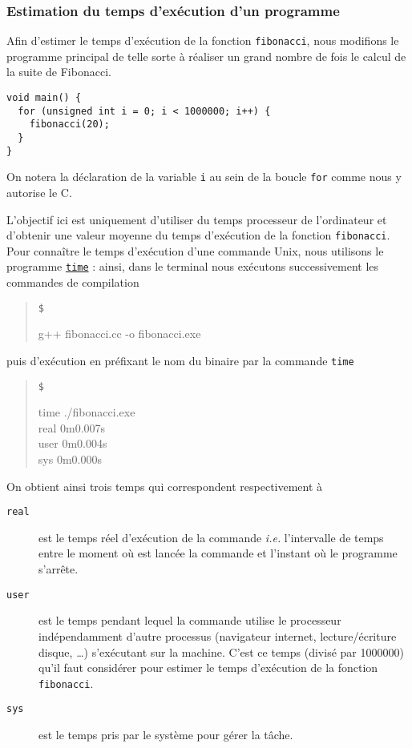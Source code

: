 \documentclass{book}
\newenvironment{prompt}{\begin{quote}\color{blue!75}\tt\$\,
}{\end{quote}}
\newcommand{\cpp}{\mbox{C\vspace{.5em}\protect\raisebox{.2ex}{\footnotesize++~}}}
\begin{document}
\begin{correction}
\subsubsection{Estimation du temps d'exécution d'un programme}

Afin d'estimer le temps d'exécution de la fonction \texttt{fibonacci}, nous modifions le
programme principal de telle sorte à réaliser un grand nombre de fois le calcul
de la suite de Fibonacci.

\begin{verbatim}
void main() {
  for (unsigned int i = 0; i < 1000000; i++) {
    fibonacci(20);
  }
}
\end{verbatim}

On notera la déclaration de la variable \texttt{i} au sein de la boucle \texttt{for} comme nous y
autorise le \cpp.

L'objectif ici est uniquement d'utiliser du temps processeur de l'ordinateur
et d'obtenir une valeur moyenne du temps d'exécution de la fonction
\texttt{fibonacci}. Pour connaître le temps d'exécution d'une commande Unix, nous
utilisons le programme \href{https://en.wikipedia.org/wiki/Time_(Unix)}{\texttt{time}} : ainsi, dans le terminal nous exécutons
successivement les commandes de compilation
\begin{prompt}
g++ fibonacci.cc -o fibonacci.exe
\end{prompt}
puis d'exécution en préfixant le nom du binaire par la commande \texttt{time}
\begin{prompt}
time ./fibonacci.exe\\
real  0m0.007s\\
user  0m0.004s\\
sys   0m0.000s
\end{prompt}
On obtient ainsi trois temps qui correspondent respectivement à

\begin{description}
\item[{\texttt{real}}] est le temps réel d'exécution de la commande \emph{i.e.} l'intervalle de
temps entre le moment où est lancée la commande et l'instant où le
programme s'arrête.
\item[{\texttt{user}}] est le temps pendant lequel la commande utilise le processeur
indépendamment d'autre processus (navigateur internet, lecture/écriture disque, \ldots{}) s'exécutant sur
la machine. C'est ce temps (divisé par 1000000) qu'il faut considérer pour estimer le temps d'exécution de la fonction \texttt{fibonacci}.
\item[{\texttt{sys}}] est le temps pris par le système pour gérer la tâche.
\end{description}



\end{correction}
\end{document}
